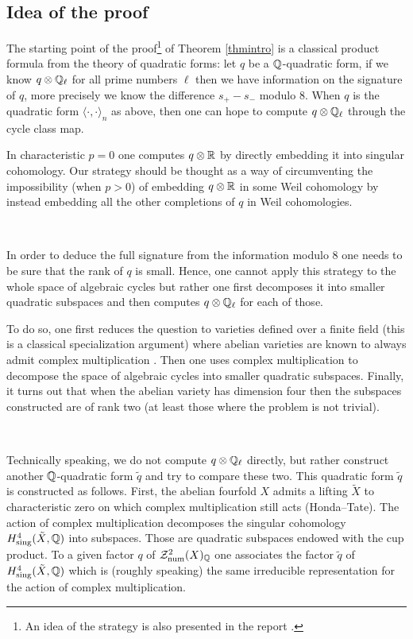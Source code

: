 \subsection*{Idea of the proof}
The starting point of the proof\footnote{An idea of the strategy is also presented in the report  \cite{Ober}.} of Theorem \ref{thmintro} is a classical product formula from the theory of quadratic forms: let $q$ be a $\mathbb{Q}$-quadratic form, if we know  $q \otimes \mathbb{Q}_\ell$ for all prime numbers $\ell$ then we have information on the signature of $q$, more precisely we know the difference $s_+-s_-$ modulo $8$. When $q$ is the quadratic form  $\langle \cdot, \cdot \rangle_{n}$ as above, then one can hope to compute $q \otimes \mathbb{Q}_\ell$ through the cycle class map.

In characteristic $p=0$ one computes $q \otimes \mathbb{R}$ by directly embedding it into singular cohomology. Our strategy should be thought as a way of circumventing the impossibility (when $p>0$) of embedding $q \otimes \mathbb{R}$ in some Weil cohomology by   instead  embedding all the other completions of   $q$ in  Weil cohomologies.

\



In order to deduce the full signature from the information modulo $8$ one needs to be sure that the rank of $q$ is small. Hence, one cannot apply this strategy to the whole space of algebraic cycles but rather one first decomposes it into smaller quadratic subspaces and then computes $q \otimes \mathbb{Q}_\ell$  for each of those.

To do so, one first   reduces the question to varieties defined over a finite field (this is a classical specialization argument) where abelian varieties are known to always  admit complex multiplication \cite{Tate}.  Then one uses complex multiplication to decompose the space of algebraic cycles into smaller quadratic subspaces. Finally,  it turns out that  when the abelian variety has dimension four then   the subspaces constructed are of rank two (at least those where the problem is not trivial).

\


Technically speaking, we do not compute $q \otimes \mathbb{Q}_\ell$ directly, but rather construct another $\mathbb{Q}$-quadratic form $\tilde{q}$ and try to compare these two. This quadratic form $\tilde{q}$ is constructed as follows. First, the abelian fourfold $X$ admits a lifting $\tilde{X}$ to characteristic zero on which  complex multiplication still acts (Honda--Tate). The action of  complex multiplication  decomposes the singular cohomology  $H_{\mathrm{sing}}^4(\tilde{X},\mathbb{Q})$ into subspaces. Those are quadratic subspaces endowed with the cup product. To a given factor $q$ of $\mathcal{Z}^2_{\mathrm{num}}(X)_{\mathbb{Q}}$ one associates the factor $\tilde{q}$  of $H_{\mathrm{sing}}^4(\tilde{X},\mathbb{Q})$ which is (roughly speaking) the same irreducible representation for the action of  complex multiplication.

